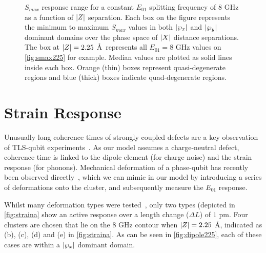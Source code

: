 \begin{figure}[htp]
\resizebox{\textwidth}{!}{}
\caption[$S_{max}$ Response Range]{\label{fig:smaxz}$S_{max}$ response range for a constant $E_{01}$ splitting frequency of $8$ GHz as a function of $\lvert Z\rvert$ separation. Each box on the figure represents the minimum to maximum $S_{max}$ values in both $\lvert\wp_{x}\rvert$ and $\lvert\wp_{y}\rvert$ dominant domains over the phase space of $\lvert X\rvert$ distance separations. The box at $\lvert Z\rvert = 2.25$ \AA\ represents all $E_{01} = 8$ GHz values on \cref{fig:smax225} for example. Median values are plotted as solid lines inside each box. Orange (thin) boxes represent quasi-degenerate regions and blue (thick) boxes indicate quad-degenerate regions.}
\end{figure}

\section{Strain Response}\label{sec:strain}

Unusually long coherence times of strongly coupled defects are a key observation of TLS-qubit experiments~\cite{Neeley2008, Lisenfeld2010a}.
As our model assumes a charge-neutral defect, coherence time is linked to the dipole element (for charge noise) and the strain response (for phonons).
Mechanical deformation of a phase-qubit has recently been observed directly~\cite{Grabovskij2012}, which we can mimic in our  model by introducing a series of deformations onto the cluster, and subsequently measure the $E_{01}$ response.

Whilst many deformation types were tested~\cite{DuBois2013}, only two types (depicted in \cref{fig:straina} show an active response over a length change ($\Delta L$) of $1$ pm.
Four clusters are chosen that lie on the $8$ GHz contour when $\lvert Z\rvert = 2.25$ \AA, indicated as (b), (c), (d) and (e) in \cref{fig:straina}.
As can be seen in \cref{fig:dipole225}, each of these cases are within a $\lvert\wp_x\rvert$ dominant domain.

